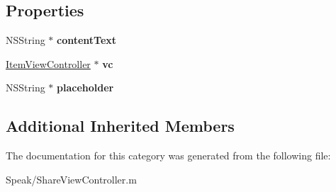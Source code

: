 \subsection*{Properties}
\begin{DoxyCompactItemize}
\item 
\hypertarget{category_share_view_controller_07_08_af0d7c5336e9578d0eb2111cd3a6799fa}{}N\+S\+String $\ast$ {\bfseries content\+Text}\label{category_share_view_controller_07_08_af0d7c5336e9578d0eb2111cd3a6799fa}

\item 
\hypertarget{category_share_view_controller_07_08_a71927eb337627192542b3996b1c88496}{}\hyperlink{interface_item_view_controller}{Item\+View\+Controller} $\ast$ {\bfseries vc}\label{category_share_view_controller_07_08_a71927eb337627192542b3996b1c88496}

\item 
\hypertarget{category_share_view_controller_07_08_a3082644d7b3f61bef361a5f2f9d00908}{}N\+S\+String $\ast$ {\bfseries placeholder}\label{category_share_view_controller_07_08_a3082644d7b3f61bef361a5f2f9d00908}

\end{DoxyCompactItemize}
\subsection*{Additional Inherited Members}


The documentation for this category was generated from the following file\+:\begin{DoxyCompactItemize}
\item 
Speak/Share\+View\+Controller.\+m\end{DoxyCompactItemize}
